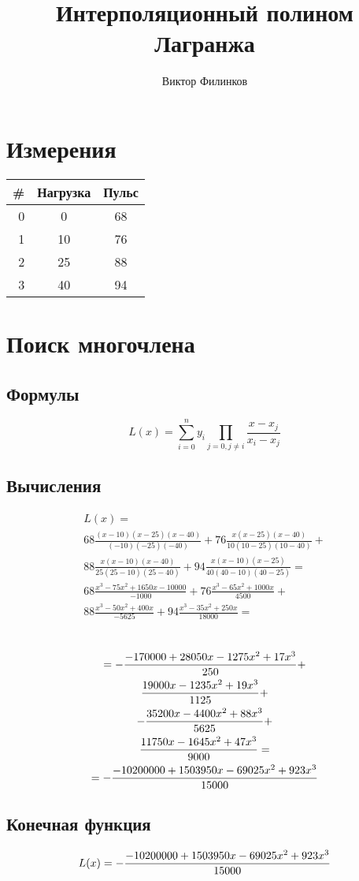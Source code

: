 \documentclass[oneside,final,14pt]{extreport}
\begin{document}
\title{Интерполяционный полином Лагранжа}
\author{Виктор Филинков}
\maketitle

\chapter*{Измерения}
\begin{table}[pht]
	\centering
	\begin{tabular}{|r | c | c|}
		\hline \textbf{\#} &  \textbf{Нагрузка} & \textbf{Пульс} \\ \hline
		0 & 0	&	68	\\ \hline
		1 & 10	&	76	\\ \hline
		2 & 25	&	88	\\ \hline
		3 & 40	&	94	\\ \hline
	\end{tabular}
	\label{measurements}
\end{table}

\chapter*{Поиск многочлена}
\section*{Формулы}

\[
	L(x)=\sum_{i=0}^{n} y_i \prod_{j = 0, j \ne i} \frac{x-x_j}{x_i-x_j}
\]

\section*{Вычисления}
\begin{multline*}
	L(x)= \\
	68 \frac{(x-10)(x-25)(x-40)}{(-10) (-25) (-40)} + 
	76 \frac{x(x-25)(x-40)}{10(10-25)(10-40)} + \\
	88 \frac{x(x-10)(x-40)}{25(25-10)(25-40)} +
	94 \frac{x(x-10)(x-25)}{40(40-10)(40-25)} = \\
	68 \frac{x^3-75x^2+1650x-10000}{-1000} +
	76 \frac{x^3-65x^2+1000x}{4500} + \\
	88 \frac{x^3-50x^2+400x}{-5625} +
	94 \frac{x^3-35x^2+250x}{18000} = \\
\end{multline*}
\begin{multline*}
\\
= -{{-170000+28050x-1275x^2+17x^3}\over{250}} + \\
{{19000x-1235x^2+19x^3}\over{1125}} + \\
-{{35200x-4400x^2+88x^3}\over{5625}} + \\
{{11750x-1645x^2+47x^3}\over{9000}} = \\
= -{{-10200000+1503950x-69025x^2+923x^3}\over{15000}} \\
\end{multline*}
\section*{Конечная функция}
\[L(x) = -{{-10200000+1503950x-69025x^2+923x^3}\over{15000}}\]
\end{document}
